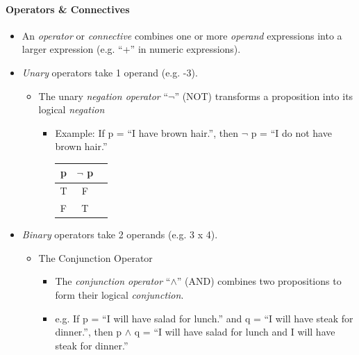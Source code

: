 \documentclass[english, 11pt]{article}
\begin{document}
\begin{addmargin}[2em]{2em}
\begin{addmargin}[1em]{2em}
          \paragraph{Operators \& Connectives}
          \begin{itemize}
            \item An \textit{operator} or \textit{connective} combines one or
            more \textit{operand} expressions into a larger expression
            (e.g. ``+'' in numeric expressions).
            \item \textit{Unary} operators take 1 operand (e.g. -3).
              \begin{itemize}
                \item The unary \textit{negation operator} ``\( \neg \)''
                (NOT) transforms a proposition into its logical \textit{negation}
                \begin{itemize}
                  \item Example: If p = ``I have brown hair.'', then
                  \( \neg \) p = ``I do not have brown hair.''
                    \begin{tabular}{c|cc}
                      p & $\neg$ p \\
                      \hline
                      T & F \\
                      F & T
                    \end{tabular}
                \end{itemize}
              \end{itemize}
            \item \textit{Binary} operators take 2 operands (e.g. 3 x 4).
              \begin{itemize}
                \item The Conjunction Operator
                  \begin{itemize}
                    \item The \textit{conjunction operator} ``$\wedge$'' (AND)
                    combines two propositions to form their logical \textit{conjunction}.
                    \item e.g. If p = ``I will have salad for lunch.'' and
                    q = ``I will have steak for dinner.'', then p $\wedge$ q =
                    ``I will have salad for lunch and I will have steak for dinner.''
                    \\
                    \\
                    \begin{tabular}{cc|ccc}

\end{tabular}
\end{itemize}
\end{itemize}
\end{itemize}
\end{addmargin}
\end{addmargin}
\end{document}
